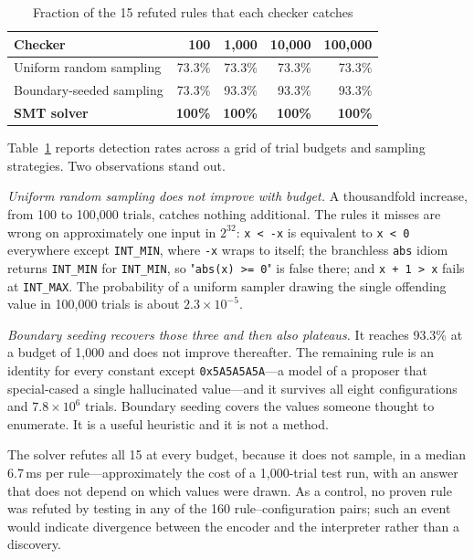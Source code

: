 \documentclass[conference]{IEEEtran}
\begin{document}
\begin{table}[t]
\caption{Fraction of the 15 refuted rules that each checker catches}
\label{tab:detect}
\centering
\begin{tabular}{@{}lrrrr@{}}
\toprule
\textbf{Checker} & \textbf{100} & \textbf{1{,}000} & \textbf{10{,}000} &
\textbf{100{,}000} \\
\midrule
Uniform random sampling & 73.3\% & 73.3\% & 73.3\% & 73.3\% \\
Boundary-seeded sampling & 73.3\% & 93.3\% & 93.3\% & 93.3\% \\
\textbf{SMT solver} & \textbf{100\%} & \textbf{100\%} & \textbf{100\%} &
\textbf{100\%} \\
\bottomrule
\end{tabular}
\end{table}

Table~\ref{tab:detect} reports detection rates across a grid of trial budgets
and sampling strategies. Two observations stand out.

\emph{Uniform random sampling does not improve with budget.} A thousandfold
increase, from 100 to 100{,}000 trials, catches nothing additional. The rules it
misses are wrong on approximately one input in $2^{32}$: \texttt{x < -x} is
equivalent to \texttt{x < 0} everywhere except \texttt{INT\_MIN}, where
\texttt{-x} wraps to itself; the branchless \texttt{abs} idiom returns
\texttt{INT\_MIN} for \texttt{INT\_MIN}, so "\texttt{abs(x) >= 0}" is false
there; and \texttt{x + 1 > x} fails at \texttt{INT\_MAX}. The probability of a
uniform sampler drawing the single offending value in 100{,}000 trials is about
$2.3\times 10^{-5}$.

\emph{Boundary seeding recovers those three and then also plateaus.} It reaches
93.3\% at a budget of 1{,}000 and does not improve thereafter. The remaining
rule is an identity for every constant except \texttt{0x5A5A5A5A}---a model of
a proposer that special-cased a single hallucinated value---and it survives all
eight configurations and $7.8\times 10^{6}$ trials. Boundary seeding covers the
values someone thought to enumerate. It is a useful heuristic and it is not a
method.

The solver refutes all 15 at every budget, because it does not sample, in a
median 6.7\,ms per rule---approximately the cost of a 1{,}000-trial test run,
with an answer that does not depend on which values were drawn. As a control,
no proven rule was refuted by testing in any of the 160 rule--configuration
pairs; such an event would indicate divergence between the encoder and the
interpreter rather than a discovery.
\end{document}
